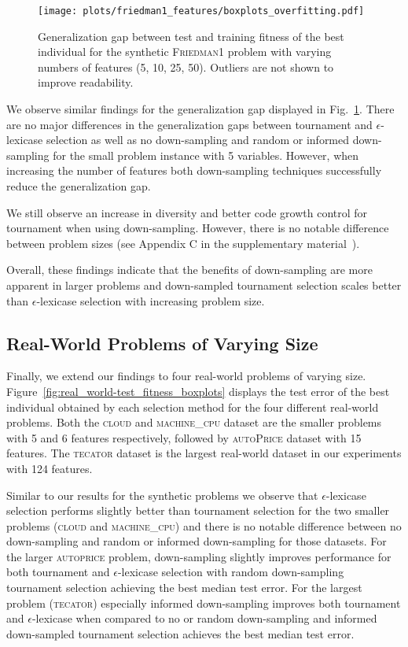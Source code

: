 \documentclass[runningheads]{llncs}
\begin{document}
\begin{figure}
    \centering
    \texttt{[image: plots/friedman1\_features/boxplots\_overfitting.pdf]}
    \caption{Generalization gap between test and training fitness of the best individual for the synthetic \textsc{Friedman1} problem with varying numbers of features (5, 10, 25, 50).  Outliers are not shown to improve readability.}
    \label{fig:friedman_features-overfitting_boxplots}
\end{figure}

We observe similar findings for the generalization gap displayed in Fig.~\ref{fig:friedman_features-overfitting_boxplots}. There are no major differences in the generalization gaps between tournament and $\epsilon$-lexicase selection as well as no down-sampling and random or informed down-sampling for the small problem instance with 5 variables. However, when increasing the number of features both down-sampling techniques successfully reduce the generalization gap. 

We still observe an increase in diversity and better code growth control for tournament when using down-sampling. However, there is no notable difference between problem sizes (see Appendix C in the supplementary material~\cite{zenodo}).

Overall, these findings indicate that the benefits of down-sampling are more apparent in larger problems and down-sampled tournament selection scales better than $\epsilon$-lexicase selection with increasing problem size.

\subsection{Real-World Problems of Varying Size}
\label{subsec:results_real_world}

Finally, we extend our findings to four real-world problems of varying size.
Figure~\ref{fig:real_world-test_fitness_boxplots} displays the test error of the best individual obtained by each selection method for the four different real-world problems. Both the \textsc{cloud} and \textsc{machine\_cpu} dataset are the smaller problems with 5 and 6 features respectively, followed by \textsc{autoPrice} dataset with 15 features. The \textsc{tecator} dataset is the largest real-world dataset in our experiments with 124 features. 

Similar to our results for the synthetic problems we observe that $\epsilon$-lexicase selection performs slightly better than tournament selection for the two smaller problems (\textsc{cloud} and \textsc{machine\_cpu}) and there is no notable difference between no down-sampling and random or informed down-sampling for those datasets. 
For the larger \textsc{autoprice} problem, down-sampling slightly improves performance for both tournament and $\epsilon$-lexicase selection with random down-sampling tournament selection achieving the best median test error.
For the largest problem (\textsc{tecator}) especially informed down-sampling improves both tournament and $\epsilon$-lexicase when compared to no or random down-sampling and informed down-sampled tournament selection achieves the best median test error.
\end{document}
